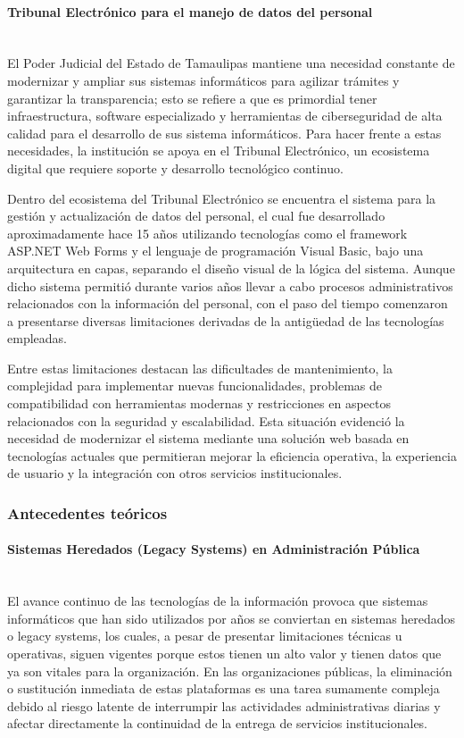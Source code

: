 \paragraph{Tribunal Electrónico para el manejo de datos del personal} ~\\
\label{sec:sistemas_informacion}El Poder Judicial del Estado de Tamaulipas mantiene una necesidad constante de modernizar y ampliar sus sistemas informáticos para agilizar trámites y garantizar la transparencia; esto se refiere a que es primordial tener infraestructura, software especializado y herramientas de ciberseguridad de alta calidad para el desarrollo de sus sistema informáticos. Para hacer frente a estas necesidades, la institución se apoya en el Tribunal Electrónico, un ecosistema digital que requiere soporte y desarrollo tecnológico continuo.\cite{PJETAM:ReglamentoTribunalElectronico2022}

Dentro del ecosistema del Tribunal Electrónico se encuentra el sistema para la gestión y actualización de datos del personal, el cual fue desarrollado aproximadamente hace 15 años utilizando tecnologías como el framework ASP.NET Web Forms y el lenguaje de programación Visual Basic, bajo una arquitectura en capas, separando  el diseño visual de la lógica del sistema. 
Aunque dicho sistema permitió durante varios años llevar a cabo procesos administrativos relacionados con la información del personal, con el paso del tiempo comenzaron a presentarse diversas limitaciones derivadas de la antigüedad de las tecnologías empleadas. 

Entre estas limitaciones destacan las dificultades de mantenimiento, la complejidad para implementar nuevas funcionalidades, problemas de compatibilidad con herramientas modernas y restricciones en aspectos relacionados con la seguridad y escalabilidad. Esta situación evidenció la necesidad de modernizar el sistema mediante una solución web basada en tecnologías actuales que permitieran mejorar la eficiencia operativa, la experiencia de usuario y la integración con otros servicios institucionales.
\subsubsection{Antecedentes teóricos}
\label{sec:antecedentes_teoricos}

\paragraph{Sistemas Heredados (Legacy Systems) en Administración Pública} ~\\
\label{sec:legacy_systems}El avance continuo de las tecnologías de la información provoca que sistemas informáticos que han sido utilizados por años se conviertan en sistemas heredados o legacy systems, los cuales, a pesar de presentar limitaciones técnicas u operativas, siguen vigentes porque estos tienen un alto valor y tienen datos que ya son vitales para la organización. En las organizaciones públicas, la eliminación o sustitución inmediata de estas plataformas es una tarea sumamente compleja debido al riesgo latente de interrumpir las actividades administrativas diarias y afectar directamente la continuidad de la entrega de servicios institucionales.

